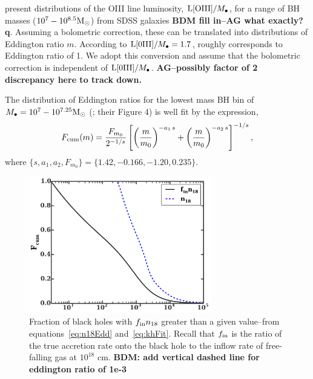 \documentclass[usenatbib,fleqn]{mnras}
\newcommand\lsim{\mathrel{\rlap{\lower4pt\hbox{\hskip1pt$\sim$}}
    \raise1pt\hbox{$<$}}}
\newcommand\gsim{\mathrel{\rlap{\lower4pt\hbox{\hskip1pt$\sim$}}
    \raise1pt\hbox{$>$}}}
\newcommand{\Mbh}[1][]{M_{\bullet#1}}
\newcommand{\Msun}{{\rm M_\odot}}
\begin{document}
\citet{Kauffmann+2009} present distributions of the OIII line
luminosity, ${\rm L[OIII]}/\Mbh$, for a range of BH masses
($10^7-10^{8.5} \Msun$) from SDSS galaxies {\bf BDM fill in--AG what
  exactly?q}.  Assuming a bolometric correction, these can be
translated into distributions of Eddington ratio $m$.  According to
\citet{Kauffmann+2009} ${\rm L[0III]}/\Mbh=1.7$, roughly corresponds
to Eddington ratio of 1. We adopt this conversion and assume that the
bolometric correction is independent of ${\rm L[0III]}/\Mbh$. {\bf
  AG--possibly factor of 2 discrepancy here to track down.}

The distribution of Eddington ratios for the lowest mass BH bin of
$M_{\bullet} = 10^7 - 10^{7.25} \Msun$ (\citealt{Kauffmann+2009};
their Figure 4) is well fit by the expression,
\begin{align}
  F_{\rm cum}(m)=\frac{F_{m_0}}{2^{-1/s}}
  \left[\left(\frac{m}{m_0}\right)^{-a_1\,
      s}+\left(\frac{m}{m_0}\right)^{-a_2 \, s}\right]^{-1/s} \label{eq:khFit},
\end{align}
where $\{s, a_1, a_2, F_{m_0}\} =\{1.42, -0.166, -1.20, 0.235\}$.

\begin{figure}
\includegraphics[width=8cm]{fcum_n18.pdf}
\caption{\label{fig:n18Cum} Fraction of black holes with $f_{\rm in}
  n_{18}$ greater than a given value--from equations~\eqref{eq:n18Edd}
  and~\eqref{eq:khFit}. Recall that $f_{\rm in}$ is the ratio of the
  true accretion rate onto the black hole to the inflow rate of
  free-falling gas at $10^{18}$ cm.   {\bf BDM: add vertical dashed line for eddington ratio of 1e-3}
}
\end{figure}
\end{document}
